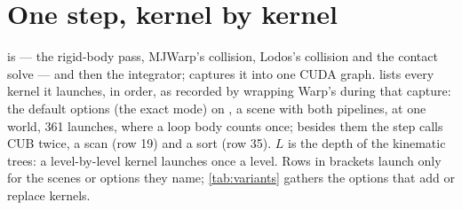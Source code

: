 \section{One step, kernel by kernel}\label{sec:step}

 is  --- the rigid-body pass, MJWarp's collision, Lodos's collision and the contact solve --- and then the integrator;  captures it into one CUDA graph.  lists every kernel it launches, in order, as recorded by wrapping Warp's  during that capture: the default options (the exact mode) on , a scene with both pipelines, at one world, 361 launches, where a loop body counts once; besides them the step calls CUB twice, a scan (row 19) and a sort (row 35). $L$ is the depth of the kinematic trees: a level-by-level kernel launches once a level. Rows in brackets launch only for the scenes or options they name; \cref{tab:variants} gathers the options that add or replace kernels.

